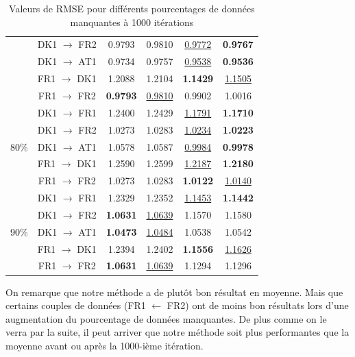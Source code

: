 \documentclass[acmsmall, natbib=false, nonacm]{acmart}
\begin{document}
\begin{table}[H]
\begin{tabular}{| c | c | c | c | c | c |}
                                & DK1 $\rightarrow$ FR2 & 0.9793 & 0.9810 & \underline{0.9772} & \textbf{0.9767} \\
                                & DK1 $\rightarrow$ AT1 & 0.9734 & 0.9757 & \underline{0.9538} & \textbf{0.9536} \\
                                & FR1 $\rightarrow$ DK1 & 1.2088 & 1.2104 & \textbf{1.1429} & \underline{1.1505} \\
                                & FR1 $\rightarrow$ FR2 & \textbf{0.9793} & \underline{0.9810} & 0.9902 & 1.0016 \\
        \hline 
        \multirow{5}{4em}{80\%} & DK1 $\rightarrow$ FR1 & 1.2400 & 1.2429 & \underline{1.1791} & \textbf{1.1710} \\
                                & DK1 $\rightarrow$ FR2 & 1.0273 & 1.0283 & \underline{1.0234} & \textbf{1.0223} \\
                                & DK1 $\rightarrow$ AT1 & 1.0578 & 1.0587 & \underline{0.9984} & \textbf{0.9978} \\
                                & FR1 $\rightarrow$ DK1 & 1.2590 & 1.2599 & \underline{1.2187} & \textbf{1.2180} \\
                                & FR1 $\rightarrow$ FR2 & 1.0273 & 1.0283 & \textbf{1.0122} & \underline{1.0140} \\
        \hline
        \multirow{5}{4em}{90\%} & DK1 $\rightarrow$ FR1 & 1.2329 & 1.2352 & \underline{1.1453} & \textbf{1.1442} \\
                                & DK1 $\rightarrow$ FR2 & \textbf{1.0631} & \underline{1.0639} & 1.1570 & 1.1580 \\
                                & DK1 $\rightarrow$ AT1 & \textbf{1.0473} & \underline{1.0484} & 1.0538 & 1.0542 \\
                                & FR1 $\rightarrow$ DK1 & 1.2394 & 1.2402 & \textbf{1.1556} & \underline{1.1626} \\
                                & FR1 $\rightarrow$ FR2 & \textbf{1.0631} & \underline{1.0639} & 1.1294 & 1.1296 \\
        \hline 
    \end{tabular}
    \caption{Valeurs de RMSE pour différents pourcentages de données manquantes à 1000 itérations}    
    \end{table}

On remarque que notre méthode a de plutôt bon résultat en moyenne. 
Mais que certains couples de données (FR1 $\leftarrow$ FR2) ont de moins bon résultats lors d'une augmentation du pourcentage de données manquantes.
De plus comme on le verra par la suite, il peut arriver que notre méthode soit plus performantes que la moyenne avant ou après la 1000-ième itération. 
\end{document}
